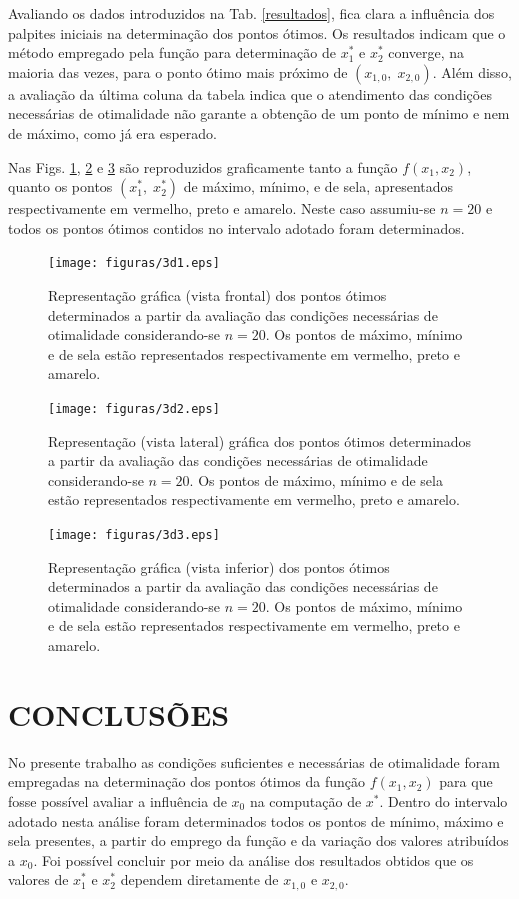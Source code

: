 \documentclass[12pt]{article}
\begin{document}
	Avaliando os dados introduzidos na Tab. \ref{resultados}, fica clara a influência dos palpites iniciais na determinação dos pontos ótimos. Os resultados indicam que o método empregado pela função  para determinação de $ x_1^* $ e $ x_2^* $ converge, na maioria das vezes, para o ponto ótimo mais próximo de $ (x_{1,0}, \; x_{2,0}) $. Além disso, a avaliação da última coluna da tabela indica que o atendimento das condições necessárias de otimalidade não garante a obtenção de um ponto de mínimo e nem de máximo, como já era esperado. 
	
 	Nas Figs. \ref{3d1}, \ref{3d2} e \ref{3d3} são reproduzidos graficamente tanto a função $ f(x_1, x_2) $, quanto os pontos $ (x_1^*, \; x_2^*) $ de máximo, mínimo, e de sela, apresentados respectivamente em vermelho, preto e amarelo. Neste caso assumiu-se $ n = 20 $ e todos os pontos ótimos contidos no intervalo adotado foram determinados.  
 	
 	\begin{figure}[H]
 		\centering
 		\texttt{[image: figuras/3d1.eps]}
 		\caption{Representação gráfica (vista frontal) dos pontos ótimos determinados a partir da avaliação das condições necessárias de otimalidade considerando-se $ n = 20 $. Os pontos de máximo, mínimo e de sela estão representados respectivamente em vermelho, preto e amarelo.}
 		\label{3d1}
 	\end{figure}
 
 	\begin{figure}[H]
 		\centering
 		\texttt{[image: figuras/3d2.eps]}
 		\caption{Representação (vista lateral) gráfica dos pontos ótimos determinados a partir da avaliação das condições necessárias de otimalidade considerando-se $ n = 20 $. Os pontos de máximo, mínimo e de sela estão representados respectivamente em vermelho, preto e amarelo.}
 		\label{3d2}
 	\end{figure}
 
 	\begin{figure}[H]
 		\centering
 		\texttt{[image: figuras/3d3.eps]}
 		\caption{Representação gráfica (vista inferior) dos pontos ótimos determinados a partir da avaliação das condições necessárias de otimalidade considerando-se $ n = 20 $. Os pontos de máximo, mínimo e de sela estão representados respectivamente em vermelho, preto e amarelo.}
 		\label{3d3}
 	\end{figure}

	\section{CONCLUSÕES}
		No presente trabalho as condições suficientes e necessárias de otimalidade foram empregadas na determinação dos pontos ótimos da função $ f(x_1, x_2) $ para que fosse possível avaliar a influência de $ x_0 $ na computação de $ x^* $. Dentro do intervalo adotado nesta análise foram determinados todos os pontos de mínimo, máximo e sela presentes, a partir do emprego da função  e da variação dos valores atribuídos a $ x_0 $. Foi possível concluir por meio da análise dos resultados obtidos que os valores de $ x_1^* $ e $ x_2^* $ dependem diretamente de $ x_{1,0} $ e $ x_{2,0} $.
\end{document}
